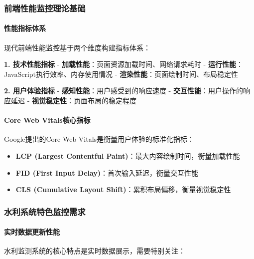 \subsubsection{前端性能监控理论基础}\label{ux524dux7aefux6027ux80fdux76d1ux63a7ux7406ux8bbaux57faux7840}

\paragraph{性能指标体系}\label{ux6027ux80fdux6307ux6807ux4f53ux7cfb}

现代前端性能监控基于两个维度构建指标体系：

\textbf{1. 技术性能指标} - \textbf{加载性能}：页面资源加载时间、网络请求耗时 - \textbf{运行性能}：JavaScript执行效率、内存使用情况 - \textbf{渲染性能}：页面绘制时间、布局稳定性

\textbf{2. 用户体验指标} - \textbf{感知性能}：用户感受到的响应速度 - \textbf{交互性能}：用户操作的响应延迟 - \textbf{视觉稳定性}：页面布局的稳定程度

\paragraph{Core Web Vitals核心指标}\label{core-web-vitalsux6838ux5fc3ux6307ux6807}

Google提出的Core Web Vitals是衡量用户体验的标准化指标：

\begin{itemize}
\tightlist
\item
  \textbf{LCP (Largest Contentful Paint)}：最大内容绘制时间，衡量加载性能
\item
  \textbf{FID (First Input Delay)}：首次输入延迟，衡量交互性能\\
\item
  \textbf{CLS (Cumulative Layout Shift)}：累积布局偏移，衡量视觉稳定性
\end{itemize}

\subsubsection{水利系统特色监控需求}\label{ux6c34ux5229ux7cfbux7edfux7279ux8272ux76d1ux63a7ux9700ux6c42}

\paragraph{实时数据更新性能}\label{ux5b9eux65f6ux6570ux636eux66f4ux65b0ux6027ux80fd}

水利监测系统的核心特点是实时数据展示，需要特别关注：


